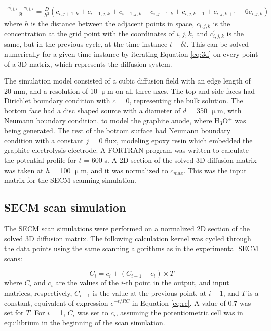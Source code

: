 \begin{equation}
\label{eq:3d}
	\begin{split}
	\frac   {c_{i,j,k}^{'} - c_{i,j,k}}{\delta t}
	=
	\frac {D} {h^2} (c_{i,j+1,k} + c_{i-1,j,k} + c_{i+1,j,k} + c_{i,j-1,k} + c_{i,j,k-1} + c_{i,j,k+1} - 6c_{i,j,k})
	\end{split}
\end{equation}
where $h$ is the distance between the adjacent points in space, $c_{i,j,k}$ is the concentration at the grid point with the coordinates of $i, j, k$, and $c_{i,j,k}^{'}$ is the same, but in the previous cycle, at the time instance $t-\delta t$.
This can be solved numerically for a given time instance by iterating Equation \ref{eq:3d} on every point of a 3D matrix, which represents the diffusion system.

The simulation model consisted of a cubic diffusion field with an edge length of 20 mm, and a resolution of 10 $\upmu$m on all three axes.
The top and side faces had Dirichlet boundary condition with $c$ = 0, representing the bulk solution.
The bottom face had a disc shaped source with a diameter of $d$ = 350 $\upmu$m, with Neumann boundary condition, to model the graphite anode, where H$_3$O$^{+}$ was being generated.
The rest of the bottom surface had Neumann boundary condition with a constant $j$ = 0 flux, modeling epoxy resin which embedded the graphite electrolysis electrode.
A FORTRAN program was written to calculate the potential profile for $t$ = 600 s.
A 2D section of the solved 3D diffusion matrix was taken at $h$ = 100 $\upmu$m, and it was normalized to $c_{max}$.
This was the input matrix for the SECM scanning simulation.

		\subsection{SECM scan simulation}
The SECM scan simulations were performed on a normalized 2D section of the solved 3D diffusion matrix.
The following calculation kernel was cycled through the data points using the same scanning algorithms as in the experimental SECM scans:

\begin{equation}
\label{eq:scan}
C_i = c_i + ( C_{i-1} - c_i ) \times T
\end{equation}
where $C_i$ and $c_i$ are the values of the $i$-th point in the output, and input matrices, respectively, $C_{i-1}$ is the value at the previous point, at $i-1$, and $T$ is a constant, equivalent of expression $e^{-t/RC}$ in Equation \ref{eq:rc}.
A value of 0.7 was set for $T$.
For $i$ = 1, $C_i$ was set to $c_i$, assuming the potentiometric cell was in equilibrium in the beginning of the scan simulation.

